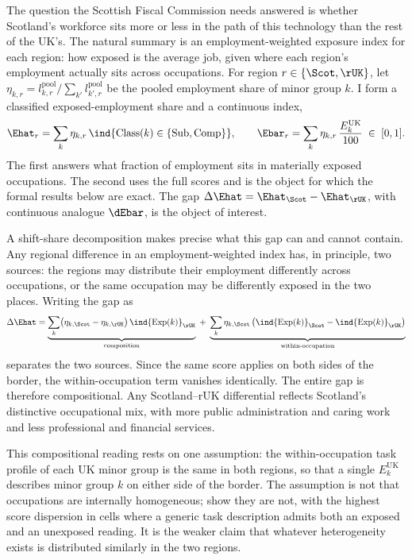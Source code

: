 The question the Scottish Fiscal Commission needs answered is whether Scotland's workforce sits more or less in the path of this technology than the rest of the UK's. The natural summary is an employment-weighted exposure index for each region: how exposed is the average job, given where each region's employment actually sits across occupations. For region $r \in \{\Scot, \rUK\}$, let $\eta_{k,r} = l^{\mathrm{pool}}_{k,r} \big/ \sum_{k'} l^{\mathrm{pool}}_{k',r}$ be the pooled employment share of minor group $k$. I form a classified exposed-employment share and a continuous index,
\begin{equation}\label{eq:indices}
\Ehat_r = \sum_k \eta_{k,r}\,
  \ind{\mathrm{Class}(k) \in \{\mathrm{Sub}, \mathrm{Comp}\}},
\qquad
\Ebar_r = \sum_k \eta_{k,r}\, \frac{E^{\mathrm{UK}}_k}{100}
  \;\in\; [0,1].
\end{equation}
The first answers what fraction of employment sits in materially exposed occupations. The second uses the full scores and is the object for which the formal results below are exact. The gap $\Delta\Ehat = \Ehat_{\Scot} - \Ehat_{\rUK}$, with continuous analogue $\dEbar$, is the object of interest.

A shift-share decomposition makes precise what this gap can and cannot contain. Any regional difference in an employment-weighted index has, in principle, two sources: the regions may distribute their employment differently across occupations, or the same occupation may be differently exposed in the two places. Writing the gap as
\begin{equation}\label{eq:shiftshare}
\Delta\Ehat =
\underbrace{\sum_k \bigl(\eta_{k,\Scot} - \eta_{k,\rUK}\bigr)\,
  \ind{\mathrm{Exp}(k)}_{\rUK}}_{\text{composition}}
\;+\;
\underbrace{\sum_k \eta_{k,\Scot}\,
  \bigl(\ind{\mathrm{Exp}(k)}_{\Scot} -
        \ind{\mathrm{Exp}(k)}_{\rUK}\bigr)}_{\text{within-occupation}}
\end{equation}
separates the two sources. Since the same score applies on both sides of the border, the within-occupation term vanishes identically. The entire gap is therefore compositional. Any Scotland--rUK differential reflects Scotland's distinctive occupational mix, with more public administration and caring work and less professional and financial services.

This compositional reading rests on one assumption: the within-occupation task profile of each UK minor group is the same in both regions, so that a single $E^{\mathrm{UK}}_k$ describes minor group $k$ on either side of the border. The assumption is not that occupations are internally homogeneous; \citet{henseke2025} show they are not, with the highest score dispersion in cells where a generic task description admits both an exposed and an unexposed reading. It is the weaker claim that whatever heterogeneity exists is distributed similarly in the two regions.

